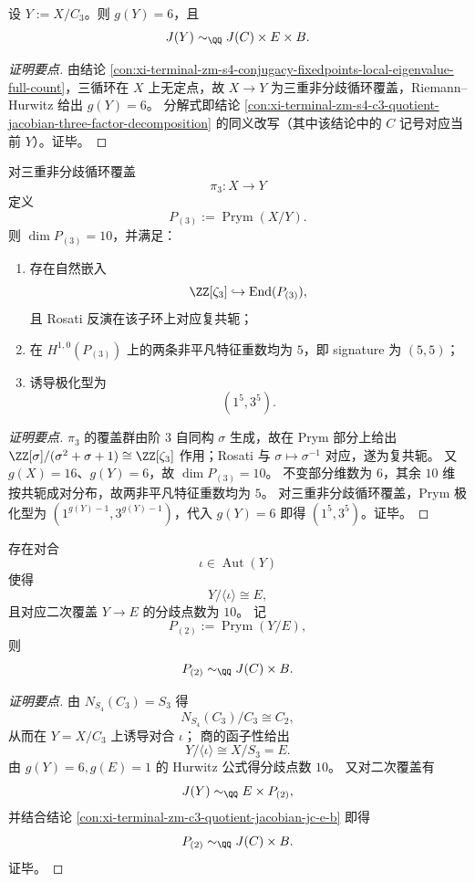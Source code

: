 \begin{conclusion}\label{con:xi-terminal-zm-c3-quotient-jacobian-jc-e-b}
设 \(Y:=X/C_3\)。则 \(g(Y)=6\)，且
\[
J(Y)\sim_{\QQ}J(C)\times E\times B.
\]
\end{conclusion}
\begin{proof}[证明要点]
由结论 \ref{con:xi-terminal-zm-s4-conjugacy-fixedpoints-local-eigenvalue-full-count}，三循环在 \(X\) 上无定点，故 \(X\to Y\) 为三重非分歧循环覆盖，Riemann--Hurwitz 给出 \(g(Y)=6\)。
分解式即结论 \ref{con:xi-terminal-zm-s4-c3-quotient-jacobian-three-factor-decomposition} 的同义改写（其中该结论中的 \(C\) 记号对应当前 \(Y\)）。证毕。
\end{proof}

\begin{conclusion}\label{con:xi-terminal-zm-c3-etale-prym-pel-signature-polarization}
对三重非分歧循环覆盖
\[
\pi_3:X\to Y
\]
定义
\[
P_{(3)}:=\operatorname{Prym}(X/Y).
\]
则 \(\dim P_{(3)}=10\)，并满足：
\begin{enumerate}
  \item 存在自然嵌入
  \[
  \ZZ[\zeta_3]\hookrightarrow \operatorname{End}(P_{(3)}),
  \]
  且 Rosati 反演在该子环上对应复共轭；
  \item 在 \(H^{1,0}(P_{(3)})\) 上的两条非平凡特征重数均为 \(5\)，即 signature 为 \((5,5)\)；
  \item 诱导极化型为
  \[
  (1^5,3^5).
  \]
\end{enumerate}
\end{conclusion}
\begin{proof}[证明要点]
\(\pi_3\) 的覆盖群由阶 \(3\) 自同构 \(\sigma\) 生成，故在 Prym 部分上给出 \(\ZZ[\sigma]/(\sigma^2+\sigma+1)\cong \ZZ[\zeta_3]\) 作用；Rosati 与 \(\sigma\mapsto \sigma^{-1}\) 对应，遂为复共轭。
又 \(g(X)=16\)、\(g(Y)=6\)，故 \(\dim P_{(3)}=10\)。
不变部分维数为 \(6\)，其余 \(10\) 维按共轭成对分布，故两非平凡特征重数均为 \(5\)。
对三重非分歧循环覆盖，Prym 极化型为 \((1^{g(Y)-1},3^{g(Y)-1})\)，代入 \(g(Y)=6\) 即得 \((1^5,3^5)\)。证毕。
\end{proof}

\begin{conclusion}\label{con:xi-terminal-zm-c3-quotient-bielliptic-prym-jc-b}
存在对合
\[
\iota\in\operatorname{Aut}(Y)
\]
使得
\[
Y/\langle\iota\rangle\cong E,
\]
且对应二次覆盖 \(Y\to E\) 的分歧点数为 \(10\)。
记
\[
P_{(2)}:=\operatorname{Prym}(Y/E),
\]
则
\[
P_{(2)}\sim_{\QQ}J(C)\times B.
\]
\end{conclusion}
\begin{proof}[证明要点]
由 \(N_{S_4}(C_3)=S_3\) 得
\[
N_{S_4}(C_3)/C_3\cong C_2,
\]
从而在 \(Y=X/C_3\) 上诱导对合 \(\iota\)；
商的函子性给出
\[
Y/\langle\iota\rangle\cong X/S_3=E.
\]
由 \(g(Y)=6,g(E)=1\) 的 Hurwitz 公式得分歧点数 \(10\)。
又对二次覆盖有
\[
J(Y)\sim_{\QQ}E\times P_{(2)},
\]
并结合结论 \ref{con:xi-terminal-zm-c3-quotient-jacobian-jc-e-b} 即得
\[
P_{(2)}\sim_{\QQ}J(C)\times B.
\]
证毕。
\end{proof}


